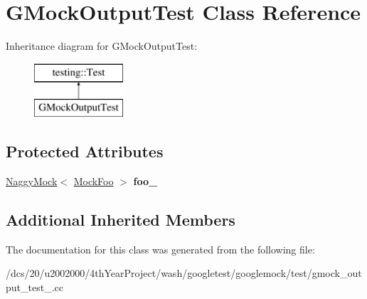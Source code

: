 \hypertarget{classGMockOutputTest}{}\section{G\+Mock\+Output\+Test Class Reference}
\label{classGMockOutputTest}
Inheritance diagram for G\+Mock\+Output\+Test\+:\begin{figure}[H]
\begin{center}
\leavevmode
\includegraphics[height=2.000000cm]{classGMockOutputTest}
\end{center}
\end{figure}
\subsection*{Protected Attributes}
\begin{DoxyCompactItemize}
\item 
\mbox{\label{classGMockOutputTest_aed97d2ca515d69466968c60575cc18a2}} 
\mbox{\hyperlink{classtesting_1_1NaggyMock}{Naggy\+Mock}}$<$ \mbox{\hyperlink{classMockFoo}{Mock\+Foo}} $>$ {\bfseries foo\+\_\+}
\end{DoxyCompactItemize}
\subsection*{Additional Inherited Members}


The documentation for this class was generated from the following file\+:\begin{DoxyCompactItemize}
\item 
/dcs/20/u2002000/4th\+Year\+Project/wash/googletest/googlemock/test/gmock\+\_\+output\+\_\+test\+\_\+.\+cc\end{DoxyCompactItemize}
